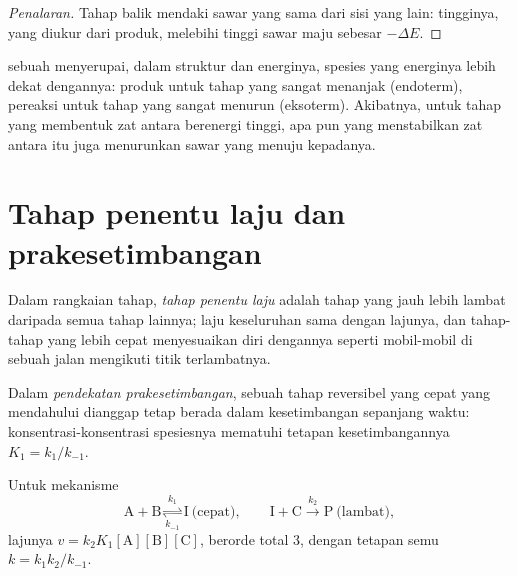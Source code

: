 \begin{proof}[Penalaran]
Tahap balik mendaki sawar yang sama dari sisi yang lain: tingginya, yang
diukur dari produk, melebihi tinggi sawar maju sebesar $-\Delta E$.
\end{proof}

\begin{proposition}\label{prop:b1:elementary-steps:hammond}
 sebuah  menyerupai, dalam struktur dan
energinya, spesies yang energinya lebih dekat dengannya: produk untuk
tahap yang sangat menanjak (endoterm), pereaksi untuk tahap yang sangat
menurun (eksoterm). Akibatnya, untuk tahap yang membentuk zat antara
berenergi tinggi, apa pun yang menstabilkan zat antara itu juga
menurunkan sawar yang menuju kepadanya.
\end{proposition}
\admitted

\section{Tahap penentu laju dan prakesetimbangan}

\begin{definition}\label{def:b1:elementary-steps:rds}
Dalam rangkaian tahap,
\emph{tahap penentu laju} adalah tahap yang jauh lebih lambat daripada semua tahap lainnya;
laju keseluruhan sama dengan lajunya, dan tahap-tahap yang lebih cepat
menyesuaikan diri dengannya seperti mobil-mobil di sebuah jalan
mengikuti titik terlambatnya.
\end{definition}

\begin{definition}\label{def:b1:elementary-steps:pre-equilibrium}
Dalam \emph{pendekatan prakesetimbangan},
sebuah tahap reversibel yang cepat yang mendahului 
dianggap tetap berada dalam kesetimbangan sepanjang waktu:
konsentrasi-konsentrasi spesiesnya mematuhi tetapan kesetimbangannya
$K_1 = k_1/k_{-1}$.
\end{definition}

\begin{proposition}\label{prop:b1:elementary-steps:pre-equilibrium-law}
Untuk mekanisme
\[
  \mathrm{A} + \mathrm{B} \underset{k_{-1}}{\overset{k_1}{\rightleftharpoons}} \mathrm{I}
  \ \text{(cepat)}, \qquad
  \mathrm{I} + \mathrm{C} \xrightarrow{\ k_2\ } \mathrm{P} \ \text{(lambat)},
\]
lajunya $v = k_2K_1[\mathrm{A}][\mathrm{B}][\mathrm{C}]$, berorde total 3,
dengan tetapan semu $k = k_1k_2/k_{-1}$.
\end{proposition}

